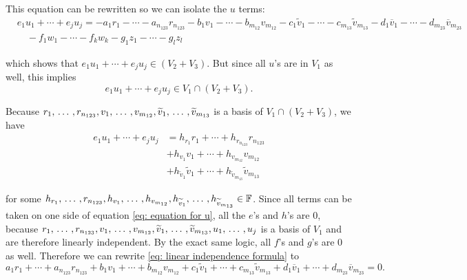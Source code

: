 \begin{xrcs}
%
This equation can be rewritten so we can isolate the $u$ terms:
\[
\begin{aligned}
  &e_{1} u_1 + \cdots + e_j u_j = - a_1r_1 -  \cdots - a_{n_{123}} r_{n_{123}} - b_1v_1 -  \cdots - b_{m_{12}} v_{m_{12}} -  c_1\widetilde{v}_1 - \cdots - c_{m_{13}}\widetilde{v}_{m_{13}} - d_{1}\overline{v}_1 - \cdots - d_{m_{23}}\overline{v}_{m_{23}} \\
  & \quad - f_1 w_1 - \cdots - f_k w_k - g_1 z_1 - \cdots - g_l z_l
\end{aligned}
\]

which shows that $e_{1} u_1 + \cdots + e_j u_j \in (V_2 + V_3)$. But since all $u$'s are in $V_1$ as well, this implies
\[ e_{1} u_1 + \cdots + e_j u_j \in V_1 \cap (V_2 + V_3).\]


Because $r_{1}, {\, \ldots \,\,}, r_{n_{123}}, v_{1}, {\, \ldots \,\,}, v_{m_{12}}, \widetilde{v}_1, {\, \ldots \,\,}, \widetilde{v}_{m_{13}}$ is a basis of $V_1 \cap (V_2+V_3)$, we have
\begin{equation}
  \label{eq: equation for u}
  \begin{aligned}
  e_{1} u_1 + \cdots + e_j u_j &= h_{r_{1}} r_{1} + \cdots + h_{r_{n_{123}}} r_{n_{123}} \\
  &  + h_{v_{1}} v_{1} + \cdots + h_{v_{m_{12}}} v_{m_{12}} \\
  &  + h_{\widetilde{v}_1} \widetilde{v}_1 + \cdots + h_{\widetilde{v}_{m_{13}}} \widetilde{v}_{m_{13}}
  \end{aligned}
\end{equation}

for some $h_{r_{1}}, {\, \ldots \,\,}, r_{n_{123}}, h_{v_{1}}, {\, \ldots \,\,}, h_{v_{m_{12}}}, h_{\widetilde{v}_1}, {\, \ldots \,\,},  h_{\widetilde{v}_{m_{13}}}  \in \mathbb{F}$. Since all terms can be taken on one side of equation \eqref{eq: equation for u}, all the $e$'s and $h$'s are $0$, because $r_1, {\, \ldots \,\,}, r_{n_{123}}, v_1, {\, \ldots \,\,}, v_{m_{12}}, \widetilde{v}_1, {\, \ldots \,\,}, \widetilde{v}_{m_{13}}, u_1, {\, \ldots \,\,}, u_j$ is a basis of $V_1$ and are therefore linearly independent. By the exact same logic, all $f$'s and $g$'s are $0$ as well. Therefore we can rewrite \eqref{eq: linear independence formula} to
\begin{equation}
  \label{eq: second linear independence formula}
  a_1r_1 +  \cdots + a_{n_{123}} r_{n_{123}} + b_1v_1 +  \cdots + b_{m_{12}} v_{m_{12}} +  c_1\widetilde{v}_1 + \cdots + c_{m_{13}}\widetilde{v}_{m_{13}} + d_{1}\overline{v}_1 + \cdots + d_{m_{23}}\overline{v}_{m_{23}} = 0.
\end{equation}



\end{xrcs}
